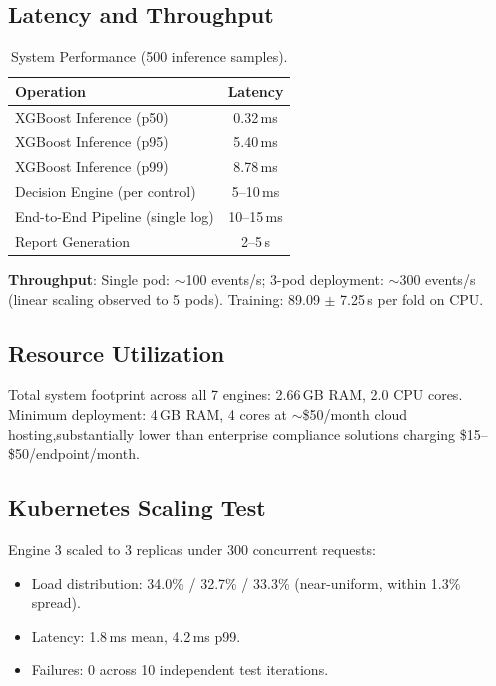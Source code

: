 \documentclass[futureinternet,article,submit,pdftex,moreauthors]{Definitions/mdpi}
\begin{document}
\subsection{Latency and Throughput}

\begin{table}[H]
\caption{System Performance (500 inference samples).\label{tab:performance}}
\begin{tabularx}{\textwidth}{lC}
\toprule
\textbf{Operation} & \textbf{Latency} \\
\midrule
XGBoost Inference (p50) & 0.32\,ms \\
XGBoost Inference (p95) & 5.40\,ms \\
XGBoost Inference (p99) & 8.78\,ms \\
Decision Engine (per control) & 5--10\,ms \\
End-to-End Pipeline (single log) & 10--15\,ms \\
Report Generation & 2--5\,s \\
\bottomrule
\end{tabularx}
\end{table}

\textbf{Throughput}: Single pod: $\sim$100 events/s; 3-pod deployment: $\sim$300 events/s
(linear scaling observed to 5 pods). Training: 89.09 $\pm$ 7.25\,s per fold on CPU.

\subsection{Resource Utilization}

Total system footprint across all 7 engines: 2.66\,GB RAM, 2.0 CPU cores. Minimum deployment:
4\,GB RAM, 4 cores at $\sim$\$50/month cloud hosting,substantially lower than enterprise
compliance solutions charging \$15--\$50/endpoint/month.

\subsection{Kubernetes Scaling Test}

Engine 3 scaled to 3 replicas under 300 concurrent requests:
\begin{itemize}
\item Load distribution: 34.0\% / 32.7\% / 33.3\% (near-uniform, within 1.3\% spread).
\item Latency: 1.8\,ms mean, 4.2\,ms p99.
\item Failures: 0 across 10 independent test iterations.
\end{itemize}
\end{document}
